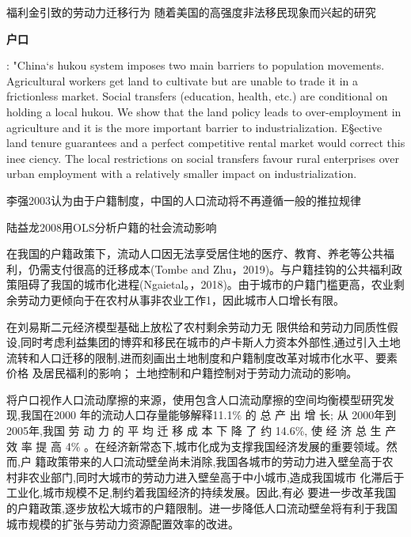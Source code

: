 \documentclass[a4paper,12pt]{article}
\begin{document}
福利金引致的劳动力迁移行为
\cite{benjaminImportingPoorWelfare2004}
\cite{mckinnishWelfareinducedMigrationState2007}
随着美国的高强度非法移民现象而兴起的研究







\textbf{户口}

\cite{ngaiChinasMobilityBarriers2019}: "China‘s hukou system imposes two main barriers to population movements. Agricultural workers get land to cultivate but are unable to trade it in a frictionless market. Social transfers (education, health, etc.) are conditional on holding a local hukou. We show that the land policy leads to over-employment in agriculture and it is the more important barrier to industrialization. E§ective land tenure guarantees and a perfect competitive rental market would correct this ine¢ ciency. The local restrictions on social transfers favour rural enterprises over urban employment with a relatively smaller impact on industrialization.

李强2003认为由于户籍制度，中国的人口流动将不再遵循一般的推拉规律

陆益龙2008用OLS分析户籍的社会流动影响

在我国的户籍政策下，流动人口因无法享受居住地的医疗、教育、养老等公共福利，仍需支付很高的迁移成本(Tombe and Zhu，2019)。与户籍挂钩的公共福利政策阻碍了我国的城市化进程(Ngaietal。，2018)。由于城市的户籍门槛更高，农业剩余劳动力更倾向于在农村从事非农业工作1，因此城市人口增长有限。

\cite{ZhouWenTuDiLiuZhuanHuJiZhiDuGaiGeYuZhongGuoChengShiHuaLiLunYuMoNi2017}
在刘易斯二元经济模型基础上放松了农村剩余劳动力无  限供给和劳动力同质性假设,同时考虑利益集团的博弈和移民在城市的卢卡斯人力资本外部性,通过引入土地流转和人口迁移的限制,进而刻画出土地制度和户籍制度改革对城市化水平、要素价格  及居民福利的影响；
土地控制和户籍控制对于劳动力流动的影响。

\cite{WangLiLiWoGuoRenKouQianYiChengBenChengShiGuiMoYuShengChanLu2020}将户口视作人口流动摩擦的来源，使用包含人口流动摩擦的空间均衡模型研究发现,我国在2000 年的流动人口存量能够解释11.1\% 的 总 产 出 增 长; 从  2000年到2005年,我国 劳 动 力 的 平 均 迁 移 成 本 下 降 了 约 14.6\%, 使 经 济 总  生 产 效 率 提 高 4\% 。在经济新常态下,城市化成为支撑我国经济发展的重要领域。然而,户  籍政策带来的人口流动壁垒尚未消除,我国各城市的劳动力进入壁垒高于农  村非农业部门,同时大城市的劳动力进入壁垒高于中小城市,造成我国城市  化滞后于工业化,城市规模不足,制约着我国经济的持续发展。因此,有必  要进一步改革我国的户籍政策,逐步放松大城市的户籍限制。进一步降低人口流动壁垒将有利于我国城市规模的扩张与劳动力资源配置效率的改进。
\end{document}
